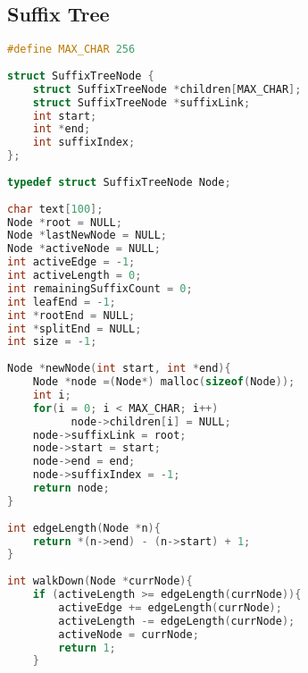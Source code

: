 \subsection*{Suffix Tree}
\begin{lstlisting}[language=C++, title={Árvore de Sufixos de Ukkonen}]
#define MAX_CHAR 256
 
struct SuffixTreeNode {
    struct SuffixTreeNode *children[MAX_CHAR];
	struct SuffixTreeNode *suffixLink;
 	int start;
    int *end;
    int suffixIndex;
};
 
typedef struct SuffixTreeNode Node;
 
char text[100];
Node *root = NULL;
Node *lastNewNode = NULL;
Node *activeNode = NULL;
int activeEdge = -1;
int activeLength = 0;
int remainingSuffixCount = 0;
int leafEnd = -1;
int *rootEnd = NULL;
int *splitEnd = NULL;
int size = -1;
 
Node *newNode(int start, int *end){
    Node *node =(Node*) malloc(sizeof(Node));
    int i;
    for(i = 0; i < MAX_CHAR; i++)
          node->children[i] = NULL; 
    node->suffixLink = root;
    node->start = start;
    node->end = end;
 	node->suffixIndex = -1;
    return node;
}
 
int edgeLength(Node *n){
    return *(n->end) - (n->start) + 1;
}
 
int walkDown(Node *currNode){
    if (activeLength >= edgeLength(currNode)){
        activeEdge += edgeLength(currNode);
        activeLength -= edgeLength(currNode);
        activeNode = currNode;
        return 1;
    }
\end{lstlisting}
\newpage
